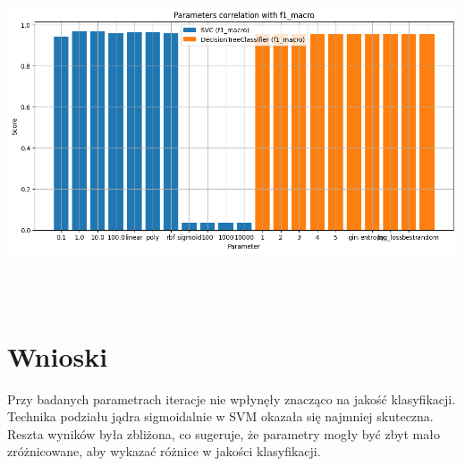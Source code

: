 \documentclass{article}
\begin{document}
\includegraphics[width=18cm, height=10cm]{output4.png}

\section{Wnioski}

Przy badanych parametrach iteracje nie wpłynęły znacząco na jakość klasyfikacji. Technika podziału jądra sigmoidalnie w SVM okazała się najmniej skuteczna.
Reszta wyników była zbliżona, co sugeruje, że parametry mogły być zbyt mało zróżnicowane, aby wykazać różnice w jakości klasyfikacji.
\end{document}
